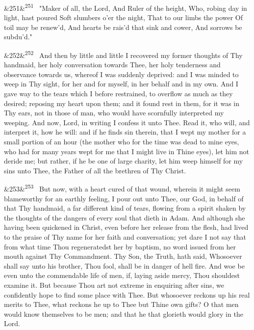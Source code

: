 \documentclass[12pt]{article}
\newcommand{\para}[1][]{\par\noindent\ifx&#1&\else\textsuperscript{\footnotesize #1}~\fi}
\begin{document}
\para[251] "Maker of all, the Lord, And Ruler of the height, Who, robing day in light, hast poured Soft slumbers o'er the night, That to our limbs the power Of toil may be renew'd, And hearts be rais'd that sink and cower, And sorrows be subdu'd."

\para[252] And then by little and little I recovered my former thoughts of Thy handmaid, her holy conversation towards Thee, her holy tenderness and observance towards us, whereof I was suddenly deprived: and I was minded to weep in Thy sight, for her and for myself, in her behalf and in my own. And I gave way to the tears which I before restrained, to overflow as much as they desired; reposing my heart upon them; and it found rest in them, for it was in Thy ears, not in those of man, who would have scornfully interpreted my weeping. And now, Lord, in writing I confess it unto Thee. Read it, who will, and interpret it, how he will: and if he finds sin therein, that I wept my mother for a small portion of an hour (the mother who for the time was dead to mine eyes, who had for many years wept for me that I might live in Thine eyes), let him not deride me; but rather, if he be one of large charity, let him weep himself for my sins unto Thee, the Father of all the brethren of Thy Christ.

\para[253] But now, with a heart cured of that wound, wherein it might seem blameworthy for an earthly feeling, I pour out unto Thee, our God, in behalf of that Thy handmaid, a far different kind of tears, flowing from a spirit shaken by the thoughts of the dangers of every soul that dieth in Adam. And although she having been quickened in Christ, even before her release from the flesh, had lived to the praise of Thy name for her faith and conversation; yet dare I not say that from what time Thou regeneratedst her by baptism, no word issued from her mouth against Thy Commandment. Thy Son, the Truth, hath said, Whosoever shall say unto his brother, Thou fool, shall be in danger of hell fire. And woe be even unto the commendable life of men, if, laying aside mercy, Thou shouldest examine it. But because Thou art not extreme in enquiring after sins, we confidently hope to find some place with Thee. But whosoever reckons up his real merits to Thee, what reckons he up to Thee but Thine own gifts? O that men would know themselves to be men; and that he that glorieth would glory in the Lord.
\end{document}
